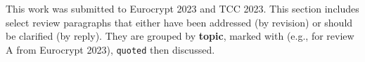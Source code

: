 This work was submitted to
Eurocrypt 2023 and TCC 2023.
This section includes select review paragraphs
that either have been addressed (by revision)
or should be clarified (by reply).
They are grouped by \textbf{topic},
marked with 
(e.g.,  for review A from Eurocrypt 2023),
\texttt{quoted} then discussed.
